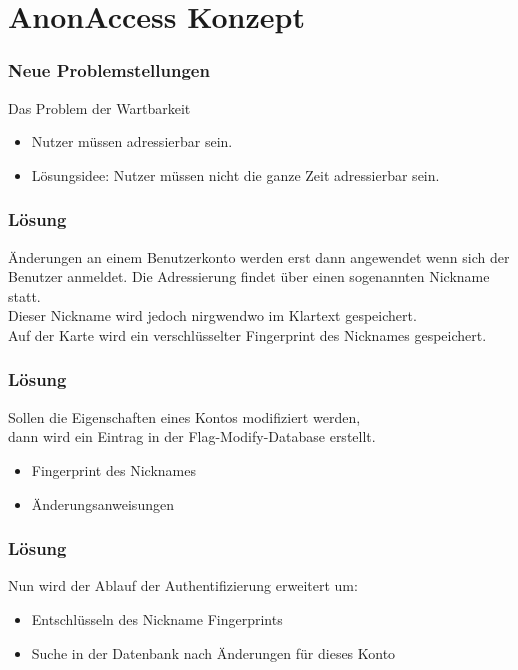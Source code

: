 \section{AnonAccess Konzept}

\begin{frame}
	\frametitle {Neue Problemstellungen}
	Das Problem der Wartbarkeit
	\begin{itemize}
		\item<2-> Nutzer müssen adressierbar sein.
		\item<3-> Lösungsidee: Nutzer müssen nicht die ganze Zeit adressierbar sein.
	\end{itemize}
\end{frame}

\begin{frame}
	\frametitle {Lösung}
	Änderungen an einem Benutzerkonto werden erst dann angewendet wenn sich der Benutzer anmeldet.
	Die Adressierung findet über einen sogenannten Nickname statt.\\
	Dieser Nickname wird jedoch nirgwendwo im Klartext gespeichert.\\
	Auf der Karte wird ein verschlüsselter Fingerprint des Nicknames gespeichert.\\
\end{frame}

\begin{frame}
	\frametitle {Lösung}
	Sollen die Eigenschaften eines Kontos modifiziert werden,\\
	dann wird ein Eintrag in der Flag-Modify-Database erstellt.
	\begin{itemize}
	\item<2-> Fingerprint des Nicknames
	\item<3-> Änderungsanweisungen
	\end{itemize}
\end{frame}

\begin{frame}
	\frametitle {Lösung}
	Nun wird der Ablauf der Authentifizierung erweitert um:
	\begin{itemize}
	\item<2-> Entschlüsseln des Nickname Fingerprints
	\item<3-> Suche in der Datenbank nach Änderungen für dieses Konto
	\end{itemize}
\end{frame}

